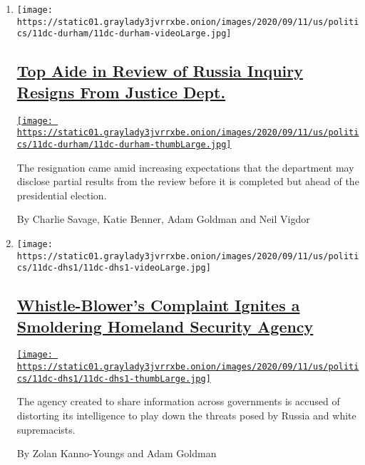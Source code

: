 \begin{enumerate}
\def\labelenumi{\arabic{enumi}.}
\item
  \texttt{[image: https://static01.graylady3jvrrxbe.onion/images/2020/09/11/us/politics/11dc-durham/11dc-durham-videoLarge.jpg]}

  \hypertarget{top-aide-in-review-of-russia-inquiry-resigns-from-justice-dept}{%
  \subsection{\texorpdfstring{\href{/2020/09/11/us/politics/nora-dannehy-durham-russia-investigation.html}{Top
  Aide in Review of Russia Inquiry Resigns From Justice
  Dept.}}{Top Aide in Review of Russia Inquiry Resigns From Justice Dept.}}\label{top-aide-in-review-of-russia-inquiry-resigns-from-justice-dept}}

  \href{/2020/09/11/us/politics/nora-dannehy-durham-russia-investigation.html}{\texttt{[image: https://static01.graylady3jvrrxbe.onion/images/2020/09/11/us/politics/11dc-durham/11dc-durham-thumbLarge.jpg]}}

  The resignation came amid increasing expectations that the department
  may disclose partial results from the review before it is completed
  but ahead of the presidential election.

  By Charlie Savage, Katie Benner, Adam Goldman and Neil Vigdor
\item
  \texttt{[image: https://static01.graylady3jvrrxbe.onion/images/2020/09/11/us/politics/11dc-dhs1/11dc-dhs1-videoLarge.jpg]}

  \hypertarget{whistle-blowers-complaint-ignites-a-smoldering-homeland-security-agency}{%
  \subsection{\texorpdfstring{\href{/2020/09/11/us/politics/whistle-blower-homeland-security.html}{Whistle-Blower's
  Complaint Ignites a Smoldering Homeland Security
  Agency}}{Whistle-Blower's Complaint Ignites a Smoldering Homeland Security Agency}}\label{whistle-blowers-complaint-ignites-a-smoldering-homeland-security-agency}}

  \href{/2020/09/11/us/politics/whistle-blower-homeland-security.html}{\texttt{[image: https://static01.graylady3jvrrxbe.onion/images/2020/09/11/us/politics/11dc-dhs1/11dc-dhs1-thumbLarge.jpg]}}

  The agency created to share information across governments is accused
  of distorting its intelligence to play down the threats posed by
  Russia and white supremacists.

  By Zolan Kanno-Youngs and Adam Goldman
\end{enumerate}


